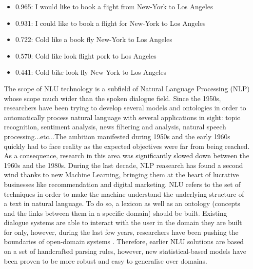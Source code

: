             \begin{itemize}
              \item 0.965: I would like to book a flight from New-York to Los Angeles
              \item 0.931: I could like to book a flight for New-York to Los Angeles
              \item 0.722: Cold like a book fly New-York to Los Angeles
              \item 0.570: Cold like look flight pork to Los Angeles
              \item 0.441: Cold bike look fly New-York to Los Angeles  
            \end{itemize}

            The scope of NLU technology is a subfield of Natural Language Processing (NLP) whose scope much wider than the spoken dialogue field. Since the 1950s, researchers have been trying to develop several models and ontologies in order to automatically process natural language with several applications in sight: topic recognition, sentiment analysis, news filtering and analysis, natural speech processing...etc...The ambition manifested during 1950s and the early 1960s quickly had to face reality as the expected objectives were far from being reached. As a consequence, research in this area was significantly slowed down between the 1960s and the 1980s. During the last decade, NLP reasearch has found a second wind thanks to new Machine Learning, bringing them at the heart of lucrative businesses like recommendation and digital marketing. NLU refers to the set of techniques in order to make the machine understand the underlying structure of a text in natural language. To do so, a lexicon as well as an ontology (concepts and the links between them in a specific domain) should be built. Existing dialogue systems are able to interact with the user in the domain they are built for only, however, during the last few years, researchers have been pushing the boundaries of open-domain systems \cite{Gasic2013}. Therefore, earlier NLU solutions are based on a set of handcrafted parsing rules, however, new statistical-based models have been proven to be more robust and easy to generalise over domains.

